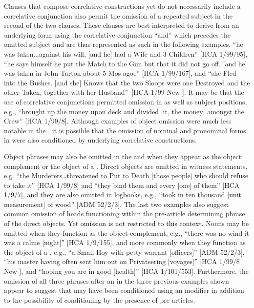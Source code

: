 Clauses that compose correlative constructions yet do not necessarily include a correlative conjunction also permit the omission of a repeated  subject in the second of the two clauses. These clauses are best interpreted to derive from an underlying form using the correlative conjunction “and” which precedes the omitted  subject and are thus represented as such in the following examples, “he was taken...against his will, [and he] had a Wife and 3 Children” [HCA 1/99/95], “he says himself he put the Match to the Gun but that it did not go off, [and he] was taken in John Tarton about 5 Mos agoe” [HCA 1/99/167], and “she Fled into the Bushes. [and she] Knows that the two Sloops were one Destroyed and the other Taken, together with her Husband”~[HCA 1/99 New \citealt{Providence1722}]. It may be that the use of correlative conjunctions permitted  omission in  as well as subject positions, e.g., “brought up the money upon deck and divided [it, the money] amongst the Crew” [HCA 1/99/8]. Although examples of object omission were much less notable in the , it is possible that the omission of nominal and pronominal  forms in  were also conditioned by underlying correlative constructions. 

Object  phrases may also be omitted in the  and when they appear as the object complement or the object of a . Direct objects are omitted in witness statements, e.g. “the Murderers…threatened to Put to Death [those people] who should refuse to take it” [HCA 1/99/8] and “they bind them and every [one] of them” [HCA 1/9/7], and they are also omitted in logbooks, e.g., “took in ten thousand [unit measurement] of wood” [ADM 52/2/3]. The last two examples also suggest common omission of  heads functioning within the pre-article determining phrase of the direct objects. Yet omission is not restricted to this context. Nouns may be omitted when they function as the object complement, e.g., “there was no wind it was a calme [night]” [HCA 1/9/155], and more commonly when they function as the object of a , e.g., “a Small Hoy with petty warrant [officers]” [ADM 52/2/3], “his master having often sent him out on Privateering [voyages]” [HCA 1/99/8 New \citealt{Providence1722}], and “hoping you are in good [health]” [HCA 1/101/553]. Furthermore, the omission of all three  phrases after an  in the three previous examples shown appear to suggest that  may have been conditioned using an  modifier in addition to the possibility of conditioning by the presence of pre-articles. 

